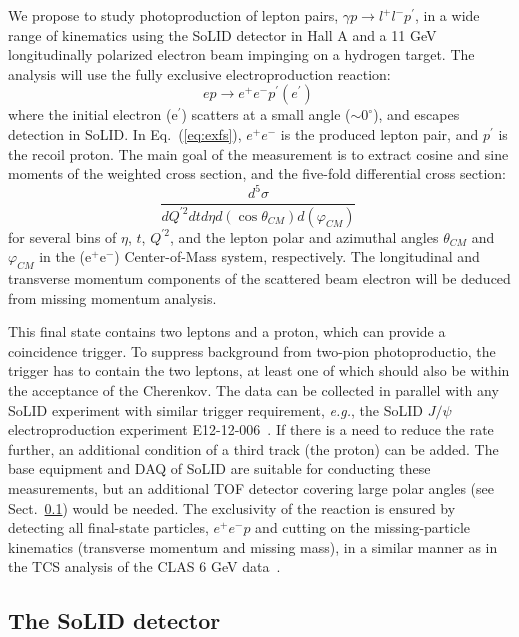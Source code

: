 We propose to study photoproduction of lepton pairs,
$\gamma p \to l^+l^-p^\prime$, in a wide range of kinematics using the
SoLID detector in Hall A and a 11 GeV longitudinally polarized electron beam
impinging on a hydrogen target.
The analysis will use the fully exclusive electroproduction reaction:
\begin{equation}
ep \to e^+e^-p^\prime(e^\prime) \
\label{eq:exfs}  
\end{equation}
where the initial electron (e$^\prime$) scatters at a small angle
($\sim 0^\circ$), and escapes detection in SoLID. In Eq.~(\ref{eq:exfs}),
$e^+e^-$ is the produced lepton pair, and $p^\prime$ is the recoil proton.
The main goal of the measurement is to extract cosine and sine moments of the
weighted cross section, and the five-fold differential cross section:
\begin{equation}
\frac{d^5\sigma}{dQ^{\prime 2}dtd\eta d(\cos{\theta_{CM}})d(\varphi_{CM})} \
\label{eq:diffxs}
\end{equation}
for several bins of $\eta$, $t$, $Q^{\prime 2}$, and the lepton polar and
azimuthal angles $\theta_{CM}$ and $\varphi_{CM}$ in the 
(e$^+$e$^-$) Center-of-Mass system, respectively.
The longitudinal and transverse momentum components of the scattered
beam electron will be deduced from missing momentum analysis. 

This final state contains two leptons and a proton, which can provide a
coincidence trigger. To suppress background from two-pion photoproductio, the
trigger has to contain the two leptons, at least one of which should also be
within the acceptance of the Cherenkov. The data can be collected in parallel
with any SoLID experiment with similar trigger requirement, {\it e.g.}, the
SoLID $J/\psi$ electroproduction experiment E12-12-006~\cite{E12-12-006}.
If there is a need to reduce the rate further, an additional condition of
a third track (the proton) can be added.
The base equipment and DAQ of SoLID are suitable for conducting these
measurements, but an additional TOF detector covering large polar angles
(see Sect.~\ref{sec:detector}) would be needed. The exclusivity of the
reaction is ensured by detecting all final-state particles, $e^+e^-p$ and
cutting on the missing-particle kinematics (transverse momentum and missing
mass), in a similar manner as in the TCS analysis of the CLAS 6 GeV
data~\cite{Rafael:2010}.

\subsection{The SoLID detector}
\label{sec:detector}

